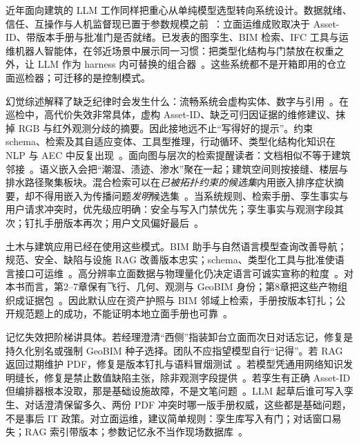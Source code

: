 近年面向建筑的 LLM 工作同样把重心从单纯模型选型转向系统设计。数据就绪、信任、互操作与人机监督现已置于参数规模之前~\cite{ma2026tenquestions}：立面运维成败取决于 Asset-ID、带版本手册与批准门是否就绪。已发表的图孪生、BIM 检索、IFC 工具与运维机器人智能体，在邻近场景中展示同一习惯：把类型化结构与门禁放在权重之外，让 LLM 作为 harness 内可替换的组合器~\cite{pan2026graphdtgpt,lu2026highwaymas,gao2026ifcagent,luo2025llmdtrobot,hellin2025bimmas,quan2026bimfacrag}。这些系统都不是开箱即用的仓立面巡检器；可迁移的是控制模式。

幻觉综述解释了缺乏纪律时会发生什么：流畅系统会虚构实体、数字与引用~\cite{ji2023}。在巡检中，高代价失效非常具体，虚构 Asset-ID、缺乏可归因证据的维修建议、抹掉 RGB 与红外观测分歧的摘要。因此接地远不止``写得好的提示''。约束 schema、检索及其自适应变体、工具型推理，行动循环、类型化结构化知识在 NLP 与 AEC 中反复出现~\cite{lewis2020,gao2023hyde,asai2024selfrag,jeong2024adaptive,peng2024,yao2023react,schick2023toolformer,pan2024b}。面向图与层次的检索提醒读者：文档相似不等于建筑邻接~\cite{peng2024,sarthi2024raptor,sun2024tog}。语义嵌入会把``潮湿、渍迹、渗水''聚在一起；建筑空间则按接缝、楼层与排水路径聚集板块。混合检索可以在\emph{已被拓扑约束的候选集}内用嵌入排序症状摘要，却不得用嵌入为传播问题\emph{发明}候选集~\cite{peng2024,jeon2025hybridrag,khattab2020}。当系统规则、检索手册、孪生事实与用户请求冲突时，优先级应明确：安全与写入门禁优先；孪生事实与观测字段其次；钉扎手册版本再次；用户文风偏好最后~\cite{saka2024gptconstruction}。

土木与建筑应用已经在使用这些模式。BIM 助手与自然语言模型查询改善导航；规范、安全、缺陷与设施 RAG 改善版本忠实；schema、类型化工具与批准使语言接口可运维~\cite{zheng2023bimassistant,joffe2025buildingcodes,lee2024ragsafety,jeon2025hybridrag,krutli2025fmrags,gao2026ifcagent,buga2025llmfmsql}。高分辨率立面数据与物理量化仍决定语言可诚实宣称的粒度~\cite{zhao2024facade,zhao2026physical}。对本书而言，第2--7章保有飞行、几何、观测与 GeoBIM 身份；第8章把这些产物组织成证据包~\cite{zhang2025,yang2025detreconreg,han2025}。因此默认应在资产护照与 BIM 邻域上检索，手册按版本钉扎；公开规范题上的成功，不能证明本地立面手册也可靠~\cite{lee2024ragsafety,ma2026tenquestions}。

记忆失效把阶梯讲具体。若经理澄清``西侧''指装卸台立面而次日对话忘记，修复是持久化别名或强制 GeoBIM 种子选择。团队不应指望模型自行``记得''。若 RAG 返回过期维护 PDF，修复是版本钉扎与语料冒烟测试~\cite{krutli2025fmrags,joffe2025buildingcodes}。若模型凭通用网络知识发明缝长，修复是禁止数值缺陷主张，除非观测字段提供~\cite{ji2023,zhao2026physical}。若孪生有正确 Asset-ID 但编排器根本没取，那是基础设施故障，不是文笔问题~\cite{lewis2020,peng2024}。LLM 起草后谁可写入孪生、对话澄清保留多久、两份 PDF 冲突时哪一版手册权威，这些都是基础问题，不是事后 IT 政策。对立面运维，建议简单规则：孪生库写入有门；对话窗口易失；RAG 索引带版本；参数记忆永不当作现场数据库~\cite{luo2025llmdtrobot,gao2026ifcagent,rawat2025llmmas}。

